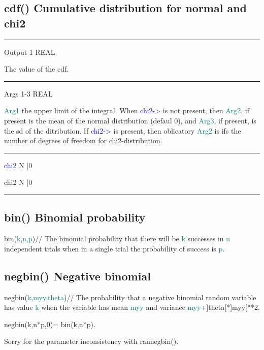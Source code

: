 \subsection{\textcolor{VioletRed}{cdf}() Cumulative distribution for normal and chi2}
\label{cdf}
\vspace{0.3cm}
\hrule
\vspace{0.3cm}
\noindent Output \tabto{3cm}  1  \tabto{5cm}   REAL  \tabto{7cm}
\begin{changemargin}{3cm}{0cm}
\noindent  The value of the cdf.
\end{changemargin}
\vspace{0.3cm}
\hrule
\vspace{0.3cm}
\noindent Args  \tabto{3cm}  1-3  \tabto{5cm}   REAL \tabto{7cm}
\begin{changemargin}{3cm}{0cm}
\noindent  \textcolor{teal}{Arg1} the upper limit of the integral. When \textcolor{blue}{chi2->} is not present, then
\textcolor{teal}{Arg2}, if present is the mean of the normal distribution (defaul 0), and \textcolor{teal}{Arg3}, if present,
is the sd of the ditribution. If \textcolor{blue}{chi2->} is present, then oblicatory \textcolor{teal}{Arg2} is
ifs the number of degrees of freedom for chi2-distribution.
\end{changemargin}
\vspace{0.3cm}
\hrule
\vspace{0.3cm}
\noindent \textcolor{blue}{chi2}  \tabto{3cm}  N |0  \tabto{5cm}    \tabto{7cm}
\begin{changemargin}{3cm}{0cm}
\noindent \noindent chi2  \tabto{3cm}  N |0  \tabto{5cm}    \tabto{7cm}
\end {changemargin}
\hrule
\vspace{0.2cm}
\subsection{\textcolor{VioletRed}{bin}() Binomial probability}
\label{bin}
\textcolor{VioletRed}{bin}(\textcolor{teal}{k},\textcolor{teal}{n},\textcolor{teal}{p})//
The binomial probability that there will be \textcolor{teal}{k} successes
in \textcolor{teal}{n} independent trials when in a
single trial the probability of success is \textcolor{teal}{p}.
\subsection{\textcolor{VioletRed}{negbin}() Negative binomial}
\label{negbin}
\textcolor{VioletRed}{negbin}(\textcolor{teal}{k},\textcolor{teal}{myy},\textcolor{teal}{theta})//
The probability that a negative binomial random variable
has value \textcolor{teal}{k} when the variable
has mean \textcolor{teal}{myy} and variance \textcolor{teal}{myy}+]theta[*]myy[**2.
\begin{note}
\textcolor{VioletRed}{negbin}(k,n*p,0)=
\textcolor{VioletRed}{bin}(k,n*p).
\end{note}
\begin{note}
Sorry for the parameter inconsistency with \textcolor{VioletRed}{rannegbin}().
\end{note}
